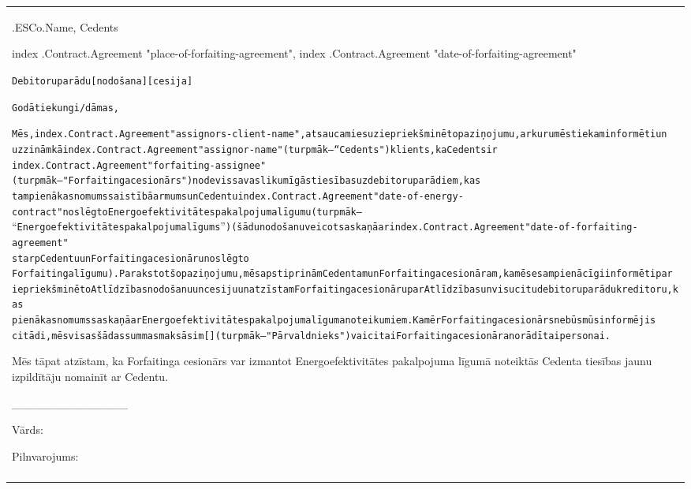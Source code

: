 \documentclass[a4paper]{article}
\begin{document}
\pagebreak

\begin{tabu}{|X|} \tabucline{}

  {{.ESCo.Name}}, Cedents\par

  \begin{flushright}
     {{index .Contract.Agreement "place-of-forfaiting-agreement"}},  {{index .Contract.Agreement "date-of-forfaiting-agreement"}} \par
  \end{flushright}

\begin{alltt}

 Debitoru parādu [nodošana] [cesija]


Godātie kungi/dāmas,


Mēs, {{index .Contract.Agreement "assignors-client-name"}}, atsaucamies uz iepriekšminēto paziņojumu, ar kuru mēs tiekam informēti un
uzzinām kā {{index .Contract.Agreement "assignor-name"}}(turpmāk – “Cedents") klients, ka Cedents ir
 {{index .Contract.Agreement "forfaiting-assignee"}} (turpmāk – "Forfaitinga cesionārs") nodevis savas likumīgās tiesības uz debitoru parādiem, kas
tam pienākas no mums saistībā ar mums un Cedentu {{index .Contract.Agreement "date-of-energy-contract"}} noslēgto Energoefektivitātes pakalpojuma līgumu (turpmāk –
“Energoefektivitātes pakalpojuma līgums”) (šādu nodošanu veicot saskaņā ar  {{index .Contract.Agreement "date-of-forfaiting-agreement"}}
starp Cedentu un Forfaitinga cesionāru noslēgto
Forfaitinga līgumu). Parakstot šo paziņojumu, mēs apstiprinām Cedentam un Forfaitinga cesionāram, ka mēs esam pienācīgi informēti par
iepriekšminēto Atlīdzības nodošanu un cesiju un atzīstam Forfaitinga cesionāru par Atlīdzības un visu citu debitoru parādu kreditoru, kas
pienākas no mums saskaņā ar Energoefektivitātes pakalpojuma līguma noteikumiem. Kamēr Forfaitinga cesionārs nebūs mūs informējis
citādi, mēs visas šādas summas maksāsim [ ] (turpmāk – "Pārvaldnieks") vai citai Forfaitinga cesionāra norādītai personai.
\end{alltt}

  \vspace{2mm}

  Mēs tāpat atzīstam, ka Forfaitinga cesionārs var izmantot Energoefektivitātes pakalpojuma līgumā noteiktās Cedenta tiesības jaunu izpildītāju
nomainīt ar Cedentu.

  \vspace{2cm}

  \begin{flushright}
    {\_\_\_\_\_\_\_\_\_\_\_\_\_\_} \par
    Vārds: \par
    Pilnvarojums: \par
  \end{flushright}

  \vspace{1cm} \\\tabucline{}

\end{tabu}
\end{document}
